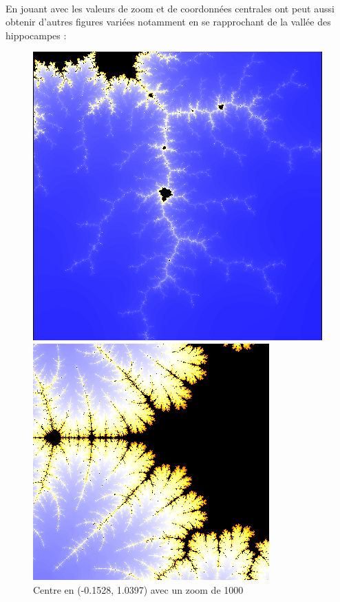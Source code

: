         \\En jouant avec les valeurs de zoom et de coordonnées centrales ont peut aussi obtenir d'autres figures variées notamment en se rapprochant de la vallée des hippocampes :
         \begin{figure}[h]
                \centering
                \begin{minipage}[b]{0.3\textwidth}
                    \includegraphics[width=\textwidth]{images/mandelbrot(-0.1528, 1.0397, 1000).png}
                    \caption{Centre en (-0.1528, 1.0397) avec un zoom de 1000}
                    \label{fig:mandel2}
                \end{minipage}
                \hfill
                \begin{minipage}[b]{0.3\textwidth}
                    \includegraphics[width=\textwidth]{images/mandelbrot1(-1.401155, 0.000180, 2000).png}

\end{minipage}
\end{figure}
